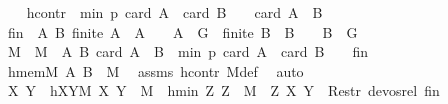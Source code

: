 \begin{isabellebody}
\ \ \isamarkupfalse%
\ hcontr{\isacharcolon}{\kern0pt}\ {\isachardoublequoteopen}{\isasymnot}\ min\ p\ {\isacharparenleft}{\kern0pt}card\ A\ {\isacharplus}{\kern0pt}\ card\ B\ {\isacharminus}{\kern0pt}\ {}{\isacharparenright}{\kern0pt}\ {\isasymle}\ card\ {\isacharparenleft}{\kern0pt}A\ {\isasymcdots}\ B{\isacharparenright}{\kern0pt}{\isachardoublequoteclose}\isanewline
\ \ \isamarkupfalse%
\ {\isacharquery}{\kern0pt}fin\ {\isacharequal}{\kern0pt}\ {\isachardoublequoteopen}{\isacharbraceleft}{\kern0pt}{\isacharparenleft}{\kern0pt}A{\isacharcomma}{\kern0pt}\ B{\isacharparenright}{\kern0pt}{\isachardot}{\kern0pt}\ finite\ A\ {\isasymand}\ A\ {\isasymnoteq}\ {\isacharbraceleft}{\kern0pt}{\isacharbraceright}{\kern0pt}\ {\isasymand}\ A\ {\isasymsubseteq}\ G\ {\isasymand}\ finite\ B\ {\isasymand}\ B\ {\isasymnoteq}\ {\isacharbraceleft}{\kern0pt}{\isacharbraceright}{\kern0pt}\ {\isasymand}\ B\ {\isasymsubseteq}\ G{\isacharbraceright}{\kern0pt}{\isachardoublequoteclose}\isanewline
\ \ \isamarkupfalse%
\ M\ \ {\isachardoublequoteopen}M\ {\isacharequal}{\kern0pt}\ {\isacharbraceleft}{\kern0pt}{\isacharparenleft}{\kern0pt}A{\isacharcomma}{\kern0pt}\ B{\isacharparenright}{\kern0pt}{\isachardot}{\kern0pt}\ card\ {\isacharparenleft}{\kern0pt}A\ {\isasymcdots}\ B{\isacharparenright}{\kern0pt}\ {\isacharless}{\kern0pt}\ min\ p\ {\isacharparenleft}{\kern0pt}card\ A\ {\isacharplus}{\kern0pt}\ card\ B\ {\isacharminus}{\kern0pt}\ {}{\isacharparenright}{\kern0pt}{\isacharbraceright}{\kern0pt}\ {\isasyminter}\ {\isacharquery}{\kern0pt}fin{\isachardoublequoteclose}\isanewline
\ \ \isamarkupfalse%
\ hmemM{\isacharcolon}{\kern0pt}\ {\isachardoublequoteopen}{\isacharparenleft}{\kern0pt}A{\isacharcomma}{\kern0pt}\ B{\isacharparenright}{\kern0pt}\ {\isasymin}\ M{\isachardoublequoteclose}\ \isamarkupfalse%
\ assms\ hcontr\ M{\isacharunderscore}{\kern0pt}def\ \isamarkupfalse%
\ auto\isanewline
\ \ \isamarkupfalse%
\ \isamarkupfalse%
\ X\ Y\ \ hXYM{\isacharcolon}{\kern0pt}\ {\isachardoublequoteopen}{\isacharparenleft}{\kern0pt}X{\isacharcomma}{\kern0pt}\ Y{\isacharparenright}{\kern0pt}\ {\isasymin}\ M{\isachardoublequoteclose}\ \ hmin{\isacharcolon}{\kern0pt}\ {\isachardoublequoteopen}{\isasymAnd}Z{\isachardot}{\kern0pt}\ Z\ {\isasymin}\ M\ {\isasymLongrightarrow}\ {\isacharparenleft}{\kern0pt}Z{\isacharcomma}{\kern0pt}\ {\isacharparenleft}{\kern0pt}X{\isacharcomma}{\kern0pt}\ Y{\isacharparenright}{\kern0pt}{\isacharparenright}{\kern0pt}\ {\isasymnotin}\ Restr\ devos{\isacharunderscore}{\kern0pt}rel\ {\isacharquery}{\kern0pt}fin{\isachardoublequoteclose}\ \isanewline

\end{isabellebody}

